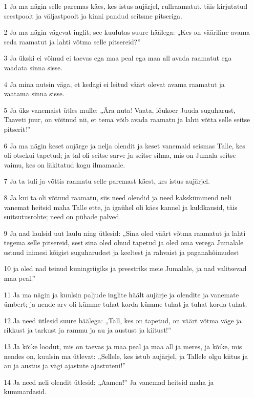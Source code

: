 \par 1 Ja ma nägin selle paremas käes, kes istus aujärjel, rullraamatut, täis kirjutatud seestpoolt ja väljastpoolt ja kinni pandud seitsme pitseriga.
\par 2 Ja ma nägin vägevat inglit; see kuulutas suure häälega: „Kes on vääriline avama seda raamatut ja lahti võtma selle pitsereid?”
\par 3 Ja ükski ei võinud ei taevas ega maa peal ega maa all avada raamatut ega vaadata sinna sisse.
\par 4 Ja mina nutsin väga, et kedagi ei leitud väärt olevat avama raamatut ja vaatama sinna sisse.
\par 5 Ja üks vanemaist ütles mulle: „Ära nuta! Vaata, lõukoer Juuda suguharust, Taaveti juur, on võitnud nii, et tema võib avada raamatu ja lahti võtta selle seitse pitserit!”
\par 6 Ja ma nägin keset aujärge ja nelja olendit ja keset vanemaid seismas Talle, kes oli otsekui tapetud; ja tal oli seitse sarve ja seitse silma, mis on Jumala seitse vaimu, kes on läkitatud kogu ilmamaale.
\par 7 Ja ta tuli ja võttis raamatu selle paremast käest, kes istus aujärjel.
\par 8 Ja kui ta oli võtnud raamatu, siis need olendid ja need kakskümmend neli vanemat heitsid maha Talle ette, ja igaühel oli käes kannel ja kuldkausid, täis suitsutusrohte; need on pühade palved.
\par 9 Ja nad laulsid uut laulu ning ütlesid: „Sina oled väärt võtma raamatut ja lahti tegema selle pitsereid, sest sina oled olnud tapetud ja oled oma verega Jumalale ostnud inimesi kõigist suguharudest ja keeltest ja rahvaist ja paganahõimudest
\par 10 ja oled nad teinud kuningriigiks ja preestriks meie Jumalale, ja nad valitsevad maa peal.”
\par 11 Ja ma nägin ja kuulsin paljude inglite häält aujärje ja olendite ja vanemate ümbert; ja nende arv oli kümme tuhat korda kümme tuhat ja tuhat korda tuhat.
\par 12 Ja need ütlesid suure häälega: „Tall, kes on tapetud, on väärt võtma väge ja rikkust ja tarkust ja rammu ja au ja austust ja kiitust!”
\par 13 Ja kõike loodut, mis on taevas ja maa peal ja maa all ja meres, ja kõike, mis nendes on, kuulsin ma ütlevat: „Sellele, kes istub aujärjel, ja Tallele olgu kiitus ja au ja austus ja vägi ajastute ajastuteni!”
\par 14 Ja need neli olendit ütlesid: „Aamen!” Ja vanemad heitsid maha ja kummardasid.



